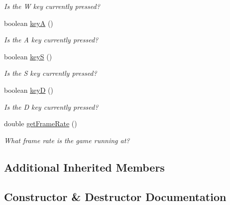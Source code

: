\begin{DoxyCompactItemize}
\begin{DoxyCompactList}\small\item\em Is the W key currently pressed? \end{DoxyCompactList}\item 
boolean \hyperlink{classbridges_1_1games_1_1_non_blocking_game_a4328a21ca65c26e11161dfe362770917}{keyA} ()
\begin{DoxyCompactList}\small\item\em Is the A key currently pressed? \end{DoxyCompactList}\item 
boolean \hyperlink{classbridges_1_1games_1_1_non_blocking_game_a4beb82246ef1eaf8c13aa406632ab936}{keyS} ()
\begin{DoxyCompactList}\small\item\em Is the S key currently pressed? \end{DoxyCompactList}\item 
boolean \hyperlink{classbridges_1_1games_1_1_non_blocking_game_a830a2e8127b042f8915deb61f0038f2a}{keyD} ()
\begin{DoxyCompactList}\small\item\em Is the D key currently pressed? \end{DoxyCompactList}\item 
double \hyperlink{classbridges_1_1games_1_1_non_blocking_game_a28e91d62c0261acb7b1b0c12a9905275}{get\+Frame\+Rate} ()
\begin{DoxyCompactList}\small\item\em What frame rate is the game running at? \end{DoxyCompactList}\end{DoxyCompactItemize}
\subsection*{Additional Inherited Members}


\subsection{Constructor \& Destructor Documentation}
\mbox{\label{classbridges_1_1games_1_1_non_blocking_game_ae85ea8dcc355372ba354f4e26323fb76}} 

